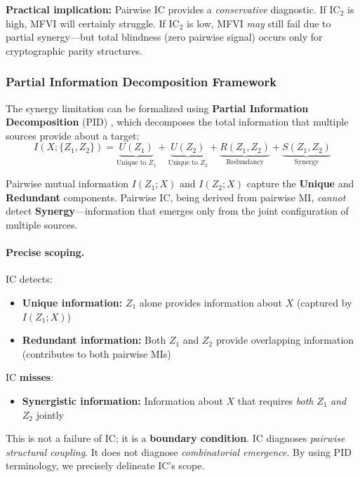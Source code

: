 \documentclass[10pt]{article} %
\theoremstyle{plain}
\theoremstyle{definition}
\begin{document}
\noindent \textbf{Practical implication:} Pairwise IC provides a \emph{conservative} diagnostic. If $\text{IC}_2$ is high, MFVI will certainly struggle. If $\text{IC}_2$ is low, MFVI \emph{may} still fail due to partial synergy---but total blindness (zero pairwise signal) occurs only for cryptographic parity structures.

\subsubsection{Partial Information Decomposition Framework}

The synergy limitation can be formalized using \textbf{Partial Information Decomposition} (PID) \citep{williams2010nonnegative}, which decomposes the total information that multiple sources provide about a target:
\begin{equation}
I(X; \{Z_1, Z_2\}) = \underbrace{U(Z_1)}_{\text{Unique to } Z_1} + \underbrace{U(Z_2)}_{\text{Unique to } Z_2} + \underbrace{R(Z_1, Z_2)}_{\text{Redundancy}} + \underbrace{S(Z_1, Z_2)}_{\text{Synergy}}
\end{equation}

Pairwise mutual information $I(Z_1; X)$ and $I(Z_2; X)$ capture the \textbf{Unique} and \textbf{Redundant} components. Pairwise IC, being derived from pairwise MI, \emph{cannot} detect \textbf{Synergy}---information that emerges only from the joint configuration of multiple sources.

\paragraph{Precise scoping.} IC detects:
\begin{itemize}
    \item \textbf{Unique information:} $Z_1$ alone provides information about $X$ (captured by $I(Z_1; X)$)
    \item \textbf{Redundant information:} Both $Z_1$ and $Z_2$ provide overlapping information (contributes to both pairwise MIs)
\end{itemize}

\noindent IC \textbf{misses}:
\begin{itemize}
    \item \textbf{Synergistic information:} Information about $X$ that requires \emph{both} $Z_1$ \emph{and} $Z_2$ jointly
\end{itemize}

This is not a failure of IC; it is a \textbf{boundary condition}. IC diagnoses \emph{pairwise structural coupling}. It does not diagnose \emph{combinatorial emergence}. By using PID terminology, we precisely delineate IC's scope.
\end{document}

